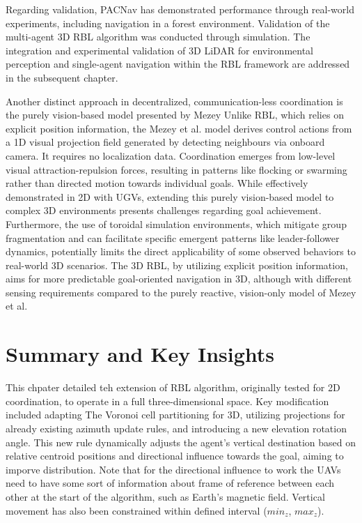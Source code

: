         Regarding validation, PACNav has demonstrated performance through real-world experiments, including navigation in a forest environment. 
        Validation of the multi-agent \ac{3D} RBL algorithm was conducted through simulation.
        The integration and experimental validation of \ac{3D} LiDAR for environmental perception and single-agent navigation within the RBL framework are addressed in the subsequent chapter.

        Another distinct approach in decentralized, communication-less coordination is the purely vision-based model presented by Mezey \cite{mezey_pure_vision}
        Unlike RBL, which relies on explicit position information, the Mezey et al. model derives control actions from a 1D visual projection field generated by detecting neighbours via onboard camera. 
        It requires no localization data. Coordination emerges from low-level visual attraction-repulsion forces, resulting in patterns like flocking or swarming rather than directed motion towards individual goals. 
        While effectively demonstrated in \ac{2D} with \ac{UGV}s, extending this purely vision-based model to complex \ac{3D} environments presents challenges regarding goal achievement. 
        Furthermore, the use of toroidal simulation environments, which mitigate group fragmentation and can facilitate specific emergent patterns like leader-follower dynamics, potentially limits the direct applicability of some observed behaviors to real-world \ac{3D} scenarios.
        The \ac{3D} RBL, by utilizing explicit position information, aims for more predictable goal-oriented navigation in \ac{3D}, although with different sensing requirements compared to the purely reactive, vision-only model of Mezey et al. 
                
    \section{Summary and Key Insights}
        This chpater detailed teh extension of \ac{RBL} algorithm, originally tested for \ac{2D} coordination, to operate in a full three-dimensional space.
        Key modification included adapting The Voronoi cell partitioning for \ac{3D}, utilizing projections for already existing azimuth update rules, and introducing a new elevation rotation angle.
        This new rule dynamically adjusts the agent's vertical destination based on relative centroid positions and directional influence towards the goal, aiming to imporve distribution.
        Note that for the directional influence to work the \ac{UAV}s need to have some sort of information about frame of reference between each other at the start of the algorithm, such as Earth's magnetic field.
        Vertical movement has also been constrained within defined interval ($min_z$, $max_z$).

